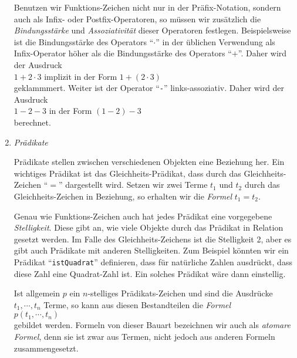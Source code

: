 \begin{enumerate}
      Benutzen wir Funktions-Zeichen nicht nur in der Pr\"afix-Notation, sondern auch als Infix- oder
      Postfix-Operatoren, so m\"ussen wir zus\"atzlich die \emph{Bindungsst\"arke} und
      \emph{Assoziativit\"at} dieser Operatoren festlegen.  Beispielsweise ist die Bindungsst\"arke des
      Operators ``$\cdot$'' in der \"ublichen Verwendung als Infix-Operator h\"oher als die
      Bindungsst\"arke des Operators ``$+$''.  Daher wird der Ausdruck
      \\[0.2cm]
      \hspace*{1.3cm}
      $1 + 2 \cdot 3$ \quad implizit in der Form \quad $1 + (2 \cdot 3)$
      \\[0.2cm]
      geklammmert.  Weiter ist der Operator ``\texttt{-}'' links-assoziativ.  Daher wird der Ausdruck
      \\[0.2cm]
      \hspace*{1.3cm}
      $1 - 2 - 3$ \quad in der Form \quad $(1 - 2) - 3$
      \\[0.2cm]
      berechnet.
\item \emph{Pr\"adikate}

      Pr\"adikate stellen zwischen verschiedenen Objekten eine Beziehung her.  Ein wichtiges Pr\"adikat
      ist das Gleichheits-Pr\"adikat, dass durch das Gleichheits-Zeichen ``$=$'' dargestellt
      wird. Setzen wir zwei Terme $t_1$ und $t_2$ durch das Gleichheits-Zeichen in Beziehung,
      so erhalten wir die \emph{Formel} $t_1 = t_2$.

      Genau wie Funktions-Zeichen auch hat jedes Pr\"adikat eine vorgegebene \emph{Stelligkeit}.
      Diese gibt an, wie viele Objekte durch das Pr\"adikat in Relation gesetzt werden.  Im Falle des
      Gleichheits-Zeichens ist die Stelligkeit 2, aber es gibt auch Pr\"adikate mit anderen Stelligkeiten.
      Zum Beispiel k\"onnten wir ein Pr\"adikat ``\texttt{istQuadrat}'' definieren, dass f\"ur nat\"urliche
      Zahlen ausdr\"uckt, dass diese Zahl eine Quadrat-Zahl ist.  Ein solches Pr\"adikat w\"are dann
      einstellig.

      Ist allgemein $p$ ein $n$-stelliges Pr\"adikats-Zeichen und sind die
      Ausdr\"ucke $t_1, \cdots, t_n$
      Terme, so kann aus diesen Bestandteilen die \emph{Formel} \\[0.2cm]
      \hspace*{1.3cm} $p(t_1,\cdots,t_n)$ \\[0.2cm]
      gebildet werden.  Formeln von dieser Bauart bezeichnen wir auch als \emph{atomare Formel}, denn
      sie ist zwar aus Termen, nicht jedoch aus anderen Formeln zusammengesetzt.


\end{enumerate}
